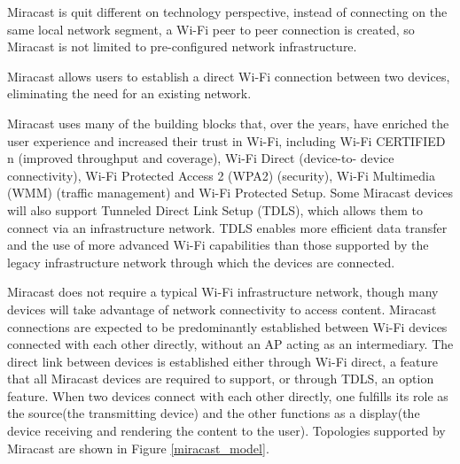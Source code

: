 Miracast \cite{miracast_industry} is quit different on technology perspective, 
instead of connecting on the same local network segment, a Wi-Fi peer to peer 
connection is created, so Miracast is not limited to pre-configured network infrastructure. 

Miracast allows users to establish a direct Wi-Fi connection between two 
devices, eliminating the need for an existing network. 

Miracast uses many of the building blocks that, over the years, have enriched 
the user experience and increased their trust in Wi-Fi, including Wi-Fi 
CERTIFIED n (improved throughput and coverage), Wi-Fi Direct (device-to- 
device connectivity), Wi-Fi Protected Access 2 (WPA2) (security), Wi-Fi 
Multimedia (WMM) (traffic management) and Wi-Fi Protected Setup. Some 
Miracast devices will also support Tunneled Direct Link Setup (TDLS), which 
allows them to connect via an infrastructure network. TDLS enables more 
efficient data transfer and the use of more advanced Wi-Fi capabilities than 
those supported by the legacy infrastructure network through which the devices 
are connected. 

Miracast does not require a typical Wi-Fi infrastructure network, though many 
devices will take advantage of network connectivity to access content. Miracast 
connections are expected to be predominantly established between Wi-Fi devices 
connected with each other directly, without an AP acting as an intermediary. 
The direct link between devices is established either through Wi-Fi direct, a 
feature that all Miracast devices are required to support, or through TDLS, an 
option feature. When two devices connect with each other directly, one fulfills 
its role as the source(the transmitting device) and the other functions as a 
display(the device receiving and rendering the content to the user). Topologies 
supported by Miracast are shown in Figure \ref{miracast_model}. 

